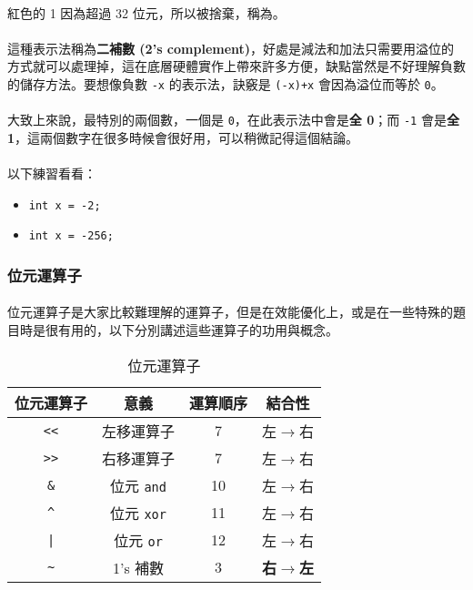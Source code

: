 \documentclass[12pt,a4paper,oneside]{article}
\begin{document}
\begin{CJK}{UTF8}{bkai}
\paragraph{}紅色的 {\color{red}1} 因為超過 32 位元，所以被捨棄，稱為。
\paragraph{}這種表示法稱為\textbf{二補數 (2's complement)}，好處是減法和加法只需要用溢位的方式就可以處理掉，這在底層硬體實作上帶來許多方便，缺點當然是不好理解負數的儲存方法。要想像負數 \lstinline!-x! 的表示法，訣竅是 \lstinline!(-x)+x! 會因為溢位而等於 \lstinline!0!。
\paragraph{}大致上來說，最特別的兩個數，一個是 \lstinline!0!，在此表示法中會是\textbf{全 0}；而 \lstinline!-1! 會是\textbf{全 1}，這兩個數字在很多時候會很好用，可以稍微記得這個結論。
\paragraph{}以下練習看看：

\begin{itemize}
\item \lstinline!int x = -2;!
\item \lstinline!int x = -256;!
\end{itemize}
  
\subsubsection{位元運算子}

\paragraph{}位元運算子是大家比較難理解的運算子，但是在效能優化上，或是在一些特殊的題目時是很有用的，以下分別講述這些運算子的功用與概念。
\begin{table}[h!]
\centering
\begin{tabular}{|c|c|c|c|}
\hline
位元運算子 & 意義 & 運算順序 & 結合性\\
\hline
\hline
\lstinline!<<! & 左移運算子 & 7 & 左$\rightarrow$右\\
\hline
\lstinline!>>! & 右移運算子 & 7 & 左$\rightarrow$右\\
\hline
\lstinline!&!  & 位元 \texttt{and} & 10 & 左$\rightarrow$右\\
\hline
\lstinline!^!  & 位元 \texttt{xor} & 11 & 左$\rightarrow$右\\
\hline
\lstinline!|!  & 位元 \texttt{or} & 12 & 左$\rightarrow$右\\
\hline
\lstinline!~!  & 1's 補數  & 3 & \textbf{右$\rightarrow$左}\\
\hline
\end{tabular}
\caption{位元運算子}
\label{basic:cpp:table:operator:bitwise}
\end{table}


\end{CJK}
\end{document}
